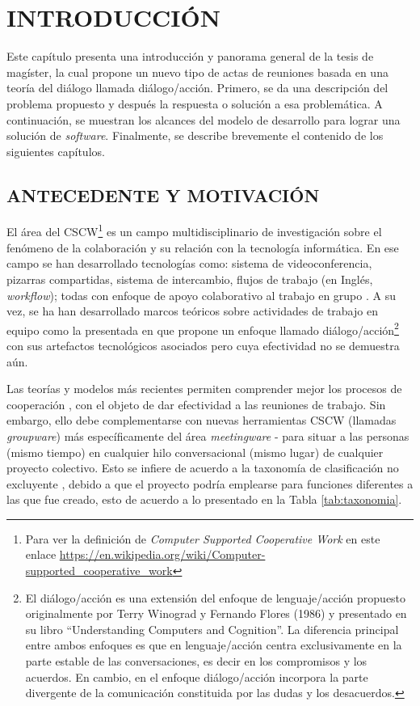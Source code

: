\section{INTRODUCCIÓN}

Este capítulo presenta una introducción y panorama general de la tesis de magíster, la cual propone un nuevo tipo de actas de reuniones basada en una teoría del diálogo llamada diálogo/acción. Primero, se da una descripción del problema propuesto y después la respuesta o solución a esa problemática. A continuación, se muestran los alcances del modelo de desarrollo para lograr una solución de \textit{software}. Finalmente, se describe brevemente el contenido de los siguientes capítulos.


\subsection{ANTECEDENTE Y MOTIVACIÓN}
El área del CSCW\footnote{Para ver la definición de \textit{Computer Supported Cooperative Work} en este enlace \url{https://en.wikipedia.org/wiki/Computer-supported_cooperative_work}} es un campo multidisciplinario de investigación sobre el fenómeno de la colaboración y su relación con la tecnología informática. En ese campo se han desarrollado tecnologías como: sistema de videoconferencia, pizarras compartidas, sistema de intercambio, flujos de trabajo (en Inglés, \textit{workflow}); todas con enfoque de apoyo colaborativo al trabajo en grupo . A su vez, se ha han desarrollado marcos teóricos sobre actividades de trabajo en equipo como la presentada en  que propone un enfoque llamado diálogo/acción\footnote{El diálogo/acción es una extensión del enfoque de lenguaje/acción propuesto originalmente por Terry Winograd y Fernando Flores (1986) y presentado en su libro “Understanding Computers and Cognition”. La diferencia principal entre ambos enfoques es que en lenguaje/acción centra exclusivamente en la parte estable de las conversaciones, es decir en los compromisos y los acuerdos. En cambio, en el enfoque diálogo/acción incorpora la parte divergente de la comunicación constituida por las dudas y los desacuerdos.} con sus artefactos tecnológicos asociados pero cuya efectividad no se demuestra aún.

Las teorías y modelos más recientes permiten comprender mejor los procesos de cooperación , con el objeto de dar efectividad a las reuniones de trabajo. Sin embargo, ello debe complementarse con nuevas herramientas CSCW (llamadas \textit{groupware}) más específicamente del área \textit{meetingware} - para situar a las personas (mismo tiempo) en cualquier hilo conversacional (mismo lugar) de cualquier proyecto colectivo. Esto se infiere de acuerdo a la taxonomía de clasificación no excluyente , debido a que el proyecto podría emplearse para funciones diferentes a las que fue creado, esto de acuerdo a lo presentado en la Tabla \ref{tab:taxonomia}.


